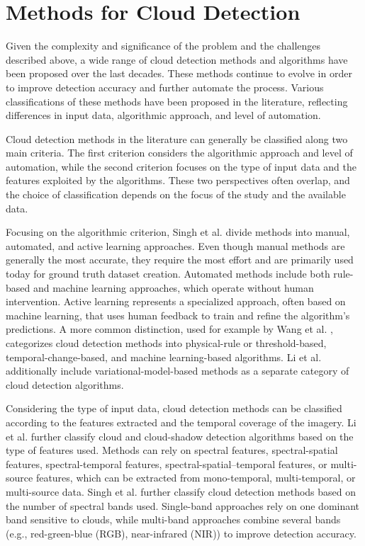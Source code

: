 \section{Methods for Cloud Detection}
\label{sec:cloud_detection_methods}

Given the complexity and significance of the problem and the challenges described above, a wide range of cloud detection methods and algorithms have been proposed over the last decades. These methods continue to evolve in order to improve detection accuracy and further automate the process. Various classifications of these methods have been proposed in the literature, reflecting differences in input data, algorithmic approach, and level of automation. 

Cloud detection methods in the literature can generally be classified along two main criteria. The first criterion considers the algorithmic approach and level of automation, while the second criterion focuses on the type of input data and the features exploited by the algorithms. These two perspectives often overlap, and the choice of classification depends on the focus of the study and the available data.


Focusing on the algorithmic criterion, Singh et al. \cite{singh2025} divide methods into manual, automated, and active learning approaches. Even though manual methods are generally the most accurate, they require the most effort and are primarily used today for ground truth dataset creation. Automated methods include both rule-based and machine learning approaches, which operate without human intervention. Active learning represents a specialized approach, often based on machine learning, that uses human feedback to train and refine the algorithm’s predictions. A more common distinction, used for example by Wang et al. \cite{wang2024}, categorizes cloud detection methods into physical-rule or threshold-based, temporal-change-based, and machine learning-based algorithms. Li et al. \cite{zhiwei2022} additionally include variational-model-based methods as a separate category of cloud detection algorithms.

Considering the type of input data, cloud detection methods can be classified according to the features extracted and the temporal coverage of the imagery. Li et al. \cite{zhiwei2022} further classify cloud and cloud-shadow detection algorithms based on the type of features used. Methods can rely on spectral features, spectral-spatial features, spectral-temporal features, spectral-spatial–temporal features, or multi-source features, which can be extracted from mono-temporal, multi-temporal, or multi-source data. Singh et al. \cite{singh2025} further classify cloud detection methods based on the number of spectral bands used. Single-band approaches rely on one dominant band sensitive to clouds, while multi-band approaches combine several bands (e.g., red-green-blue (RGB), near-infrared (NIR)) to improve detection accuracy.

